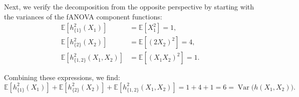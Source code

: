 Next, we verify the decomposition from the opposite perspective by starting with the variances of the fANOVA component functions:
\begin{align*}
\mathbb{E}[h_{\{1\}}^2(X_1)] 
    &= \mathbb{E}[X_1^2] 
    = 1, \\[0.5em]
\mathbb{E}[h_{\{2\}}^2(X_2)] 
    &= \mathbb{E}[(2X_2)^2] 
    = 4, \\[0.5em]
\mathbb{E}[h_{\{1,2\}}^2(X_1,X_2)] 
    &= \mathbb{E}[(X_1 X_2)^2] 
    = 1.
\end{align*}

Combining these expressions, we find:
\[
 \mathbb{E}[h_{\{1\}}^2(X_1)] + \mathbb{E}[h_{\{2\}}^2(X_2)] + \mathbb{E}[h_{\{1,2\}}^2(X_1,X_2)] 
 = 1 + 4 + 1 = 6
 = \operatorname{Var}\big(h(X_1,X_2)\big).
\]








